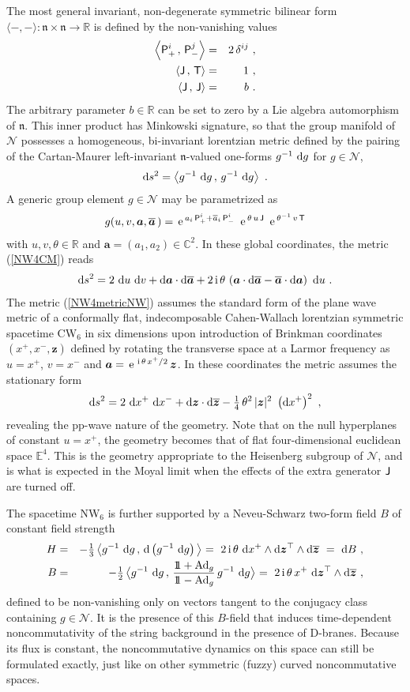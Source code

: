 \documentclass[11pt,a4paper]{article}
\def\nn{\nonumber}
\newcommand{\1}{\mathbb{1}}
\newcommand{\mbf}[1]{{\boldsymbol {#1} }}
\def\ii{{\,{\rm i}\,}}
\def\dd{{\rm d}}
\def\P{{\sf P}}
\def\T{{\sf T}}
\def\J{{\sf J}}
\def\ma{{\mbf a}}
\def\mz{{\mbf z}}
\newcommand{\complex}{{\mathbb C}} %
\newcommand{\real}{{\mathbb R}} %
\newcommand{\eucl}{{\mathbb E}}
\newcommand{\id}{{1\!\!1}} %
\def\nn{\nonumber}
\def\e{{\,\rm e}\,}
\def\bea{\begin{eqnarray}}
\def\eea{\end{eqnarray}}
\newcommand{\beq}{\begin{eqnarray}}
\newcommand{\eeq}{\end{eqnarray}}
\begin{document}
The most general invariant, non-degenerate symmetric bilinear form
$\langle-,-\rangle:\mathfrak{n}\times\mathfrak{n}\to\real$
is defined by the non-vanishing values
\bea
\left\langle\P^i_+\,,\,\P^j_-\right\rangle&=&2\,\delta^{ij} \ , \nn\\
\left\langle\J\,,\,\T\right\rangle&=&1 \ , \nn\\
\left\langle\J\,,\,\J\right\rangle&=&b \ .
\label{NW4innerprod}\eea
The arbitrary parameter $b\in\real$ can be set to zero by a Lie
algebra automorphism of $\mathfrak{n}$. This inner product has
Minkowski signature, so that the
group manifold of $\mathcal N$ possesses a
homogeneous, bi-invariant lorentzian metric defined by the pairing of
the Cartan-Maurer left-invariant $\mathfrak n$-valued one-forms
$g^{-1}~\dd g$ for $g\in\mathcal N$,
\beq
\dd s^2=\left\langle g^{-1}~\dd g\,,\,g^{-1}~\dd g\right\rangle \ .
\label{NW4CM}\eeq
A generic group element $g\in\mathcal N$ may be parametrized as
\beq
g(u,v,\ma,\overline{\ma}\,)=\e^{a_i\,\P^i_++\overline{a}_i
\,\P^i_-}~\e^{\theta\,u\,\J}~\e^{\theta^{-1}\,v\,\T}
\label{NW4coords}\eeq
with $u,v,\theta\in\real$ and $\ma=(a_1,a_2)\in\complex^2$. In these
global coordinates, the metric (\ref{NW4CM}) reads
\beq
\dd s^2=2~\dd u~\dd v+\dd\ma\cdot\dd\overline{\ma}+2\ii\theta\,\left(\ma\cdot
\dd\overline{\ma}-\overline{\ma}\cdot\dd\ma\right)~\dd u \ .
\label{NW4metricNW}\eeq
The metric (\ref{NW4metricNW}) assumes the standard form of the plane
wave metric of a conformally flat, indecomposable Cahen-Wallach
lorentzian symmetric spacetime CW$_6$ in six dimensions upon
introduction of Brinkman coordinates $(x^+,x^-,\mz)$ defined by
rotating the transverse space at a Larmor frequency as $u=x^+$,
$v=x^-$ and $\ma=\e^{\ii\theta\,x^+/2}\,\mz$. In these coordinates the
metric assumes the stationary form
\beq
\dd s^2=2~\dd x^+~\dd x^-+\dd\mz\cdot\dd\overline{\mz}
-\mbox{$\frac14$}\,\theta^2\,|\mz|^2~
\left(\dd x^+\right)^2 \ ,
\label{NW4metricBrink}\eeq
revealing the pp-wave nature of the geometry. Note that on the null
hyperplanes of constant $u=x^+$, the geometry becomes that of
flat four-dimensional euclidean space $\eucl^4$. This is the geometry
appropriate to the Heisenberg subgroup of $\mathcal{N}$, and is what
is expected in the Moyal limit when the effects of the extra generator
$\J$ are turned off.

The spacetime NW$_6$ is further supported by a Neveu-Schwarz two-form
field $B$ of constant field strength
\bea
H&=&-\mbox{$\frac13$}\,\bigl\langle g^{-1}~\dd g\,,\,\dd
\left(g^{-1}~\dd g\right)\bigl\rangle
~=~2\ii\theta~\dd x^+\wedge\dd\mz^\top\wedge\dd\overline{\mz}
~=~\dd B \ , \nn\\
B&=&-\mbox{$\frac12$}\,\bigl\langle g^{-1}~\dd g\,,\,
\frac{\id+{\rm Ad}_g}{\id-{\rm Ad}_g}\,g^{-1}~\dd g\bigl\rangle~=~
2\ii\theta\,x^+~\dd\mz^\top\wedge\dd\overline{\mz} \ ,
\label{NS2formBrink}\eea
defined to be non-vanishing only on vectors tangent to the conjugacy
class containing $g\in\mathcal{N}$. It is the presence of
this $B$-field that induces time-dependent noncommutativity of the
string background in the presence of D-branes. Because its flux is
constant, the noncommutative dynamics on this space can still be
formulated exactly, just like on other symmetric (fuzzy) curved
noncommutative spaces.
\end{document}
